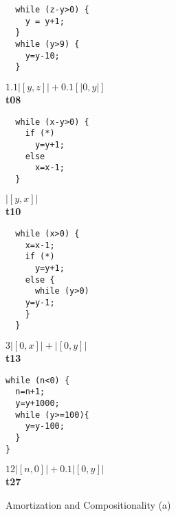 \documentclass[nocopyrightspace,preprint]{sigplanconf}
\begin{document}
\newlength{\progwidth}

\begin{figure*}[t!]
\setlength{\progwidth}{.24\linewidth}
  \centering

  \begin{minipage}[b]{\progwidth}
    \begin{center}
   \begin{lstlisting}
  while (z-y>0) {
    y = y+1;
  }
  while (y>9) {
    y=y-10;
  }
   \end{lstlisting}

$1.1|[y,z]| + 0.1[|0,y|]$
\\[.7\baselineskip] 
      {\bf t08}
    \end{center}
  \end{minipage}
%
%
%
  \begin{minipage}[b]{\progwidth}
    \begin{center}
   \begin{lstlisting}
  while (x-y>0) {
    if (*)
      y=y+1;
    else
      x=x-1;
  }
   \end{lstlisting}

$|[y,x]|$
\\[.7\baselineskip]
      {\bf t10}
    \end{center}
  \end{minipage}
%
%
%
  \begin{minipage}[b]{\progwidth}
    \begin{center}
   \begin{lstlisting}
  while (x>0) {
    x=x-1;
    if (*) 
      y=y+1;
    else {
      while (y>0)
	y=y-1;
    }
  }
   \end{lstlisting}

$3|[0,x]| + |[0,y]|$
\\[.7\baselineskip]
      {\bf t13}
    \end{center}
  \end{minipage}
%
%
%
  \begin{minipage}[b]{\progwidth}
    \begin{center}
   \begin{lstlisting}
while (n<0) {
  n=n+1;
  y=y+1000;
  while (y>=100){
    y=y-100;
  }
}
   \end{lstlisting}

$12|[n,0]| + 0.1|[0,y]|$
\\[.7\baselineskip]
      {\bf t27}
    \end{center}
  \end{minipage}
   \caption{Amortization and Compositionality (a)}
  \label{fig:cat1a}
\end{figure*}
\end{document}
